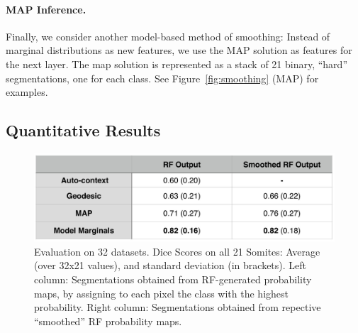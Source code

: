 \documentclass[10pt,twocolumn,letterpaper]{article}
\begin{document}
%
%
%

\paragraph{MAP Inference. }

Finally, we consider another model-based method of smoothing: Instead of marginal distributions as new features, we use the MAP solution
as features for the next layer. The map solution is represented as a stack of 21 binary, ``hard'' segmentations, one for each class. 
See Figure~\ref{fig:smoothing} (MAP) for examples.

\subsection{Quantitative Results}
%
\begin{figure}[t]
\begin{center}
\includegraphics[width=\columnwidth]{TableDiceScores_2columns_noGeoF2.jpg} %
\caption{Evaluation on 32 datasets. Dice Scores on all 21 Somites: Average (over 32x21 values), and standard deviation (in brackets). Left column: Segmentations obtained from RF-generated probability maps, by assigning to each pixel the class with the highest probability. Right column: Segmentations obtained from repective ``smoothed'' RF probability maps.}
\label{fig:results}
\end{center}
\end{figure}
\end{document}
